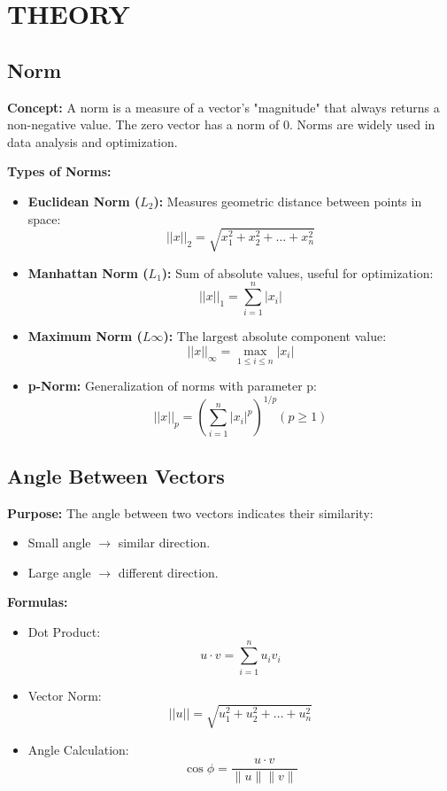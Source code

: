 \fontsize{13}{14}\selectfont
\section{THEORY}

\subsection{Norm}

\textbf{Concept:} A norm is a measure of a vector's "magnitude" that always returns a non-negative value. The zero vector has a norm of 0. Norms are widely used in data analysis and optimization.

\textbf{Types of Norms:}

\begin{itemize}[label=-]
	\item \textbf{Euclidean Norm ($L_{2}$):} Measures geometric distance between points in space:
	\[ ||x||_{2} = \sqrt{x_{1}^{2} + x_{2}^{2} + \dots+ x_{n}^{2} } \]
	\item \textbf{Manhattan Norm ($L_{1}$):} Sum of absolute values, useful for optimization:
	\[ ||x||_{1} = \sum_{i=1}^{n}|x_{i}|\]
	\item \textbf{Maximum Norm ($L\infty$):} The largest absolute component value:
	\[ ||x||_{\infty} = \max\limits_{1 \leq i\leq n} |x_{i}| \]
	\item \textbf{p-Norm:} Generalization of norms with parameter p:
	\[ ||x||_{p} = \left( \sum_{i = 1}^{n}|x_{i}|^{p} \right)^{1/p} (p \geq 1) \]
\end{itemize}

\subsection{Angle Between Vectors}

\textbf{Purpose:} The angle between two vectors indicates their similarity:

\begin{itemize}[label=-]
	\item Small angle $\rightarrow$ similar direction.
	\item Large angle $\rightarrow$ different direction.
\end{itemize}

\textbf{Formulas:} 

\begin{itemize}[label=-]
	\item Dot Product: 
	\[ u \cdot v = \sum_{i = 1}^{n} u_{i} v_{i} \]
	\item Vector Norm:
	\[ ||u|| = \sqrt{u_{1}^{2} + u_{2}^{2} + \dots + u_{n}^{2} }\]
	\item Angle Calculation: 
	\[ \cos \phi = \dfrac{u \cdot v}{\|u\| \|v\|} \]
\end{itemize} 

